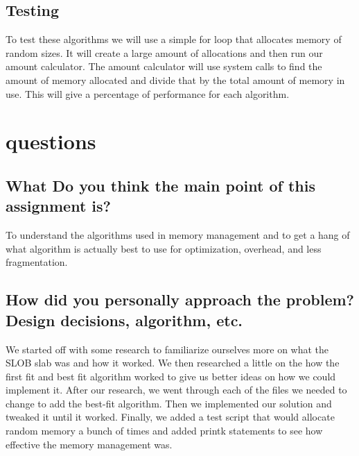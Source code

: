 \documentclass[draftclsnofoot, onecolumn, compsoc, 10pt]{IEEEtran}
\begin{document}
    \subsection{Testing}
    To test these algorithms we will use a simple for loop that allocates memory of random sizes. It will create a large amount of allocations and then run our amount calculator. The amount calculator will use system calls to find the amount of memory allocated and divide that by the total amount of memory in use. This will give a percentage of performance for each algorithm.\\

\section{questions}
    \subsection{What Do you think the main point of this assignment is?}
    To understand the algorithms used in memory management and to get a hang of what algorithm is actually best to use for optimization, overhead, and less fragmentation.\\

    \subsection{How did you personally approach the problem? Design decisions, algorithm, etc.}
    We started off with some research to familiarize ourselves more on what the SLOB slab was and how it worked. We then researched a little on the how the first fit and best fit algorithm worked to give us better ideas on how we could implement it. After our research, we went through each of the files we needed to change to add the best-fit algorithm. Then we implemented our solution and tweaked it until it worked. Finally, we added a test script that would allocate random memory a bunch of times and added printk statements to see how effective the memory management was.\\
\end{document}
